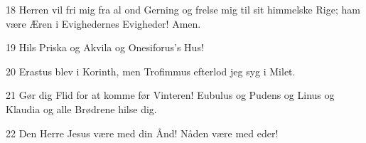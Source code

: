 \par 18 Herren vil fri mig fra al ond Gerning og frelse mig til sit himmelske Rige; ham være Æren i Evighedernes Evigheder! Amen.
\par 19 Hils Priska og Akvila og Onesiforus's Hus!
\par 20 Erastus blev i Korinth, men Trofimmus efterlod jeg syg i Milet.
\par 21 Gør dig Flid for at komme før Vinteren! Eubulus og Pudens og Linus og Klaudia og alle Brødrene hilse dig.
\par 22 Den Herre Jesus være med din Ånd! Nåden være med eder!



